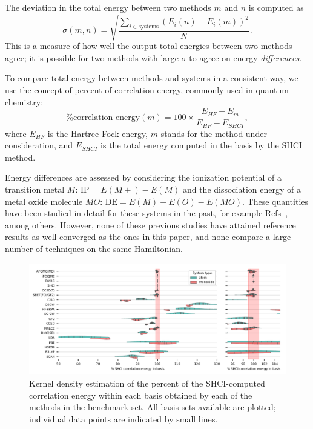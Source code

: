 The deviation in the total energy between two methods $m$ and $n$ is computed as
\begin{equation}
    \sigma(m,n) = \sqrt{\frac{\sum_{i \in \text{systems} } (E_i(n)-E_i(m))^2}{N}}.
    \label{eqn:rms}
\end{equation}
This is a measure of how well the output total energies between two methods agree; it is possible for two methods with large $\sigma$ to agree on energy \textit{differences}. 

To compare total energy between methods and systems in a consistent way, we use the concept of percent of correlation energy, commonly used in quantum chemistry:
\begin{equation}
    \text{\% correlation energy}(m) = 100 \times \frac{E_{HF} - E_{m}}{E_{HF}-E_{SHCI}},
    \label{eqn:correlation_energy}
\end{equation}
where $E_{HF}$ is the Hartree-Fock energy, $m$ stands for the method under consideration, and $E_{SHCI}$ is the total energy computed in the basis by the SHCI method.

Energy differences are assessed by considering the ionization potential of a transition metal $M$: $\text{IP}=E(M+) - E(M)$ and the dissociation energy of a metal oxide molecule $MO$: $\text{DE}=E(M)+E(O)-E(MO)$.
These quantities have been studied in detail for these systems in the past, for example Refs~\cite{bauschlicher_theoretical_1995,furche_performance_2006,doblhoff-dier_diffusion_2016,verma_assessment_2017,xu_practical_2015,bligaard_toward_2016,mardirossian_thirty_2017,minenkov_troubles_2016,thomas_accurate_2015,tew_explicitly_2016,johnson_communication:_2017}, among others. 
However, none of these previous studies have attained reference results as well-converged as the ones in this paper,
and none compare a large number of techniques on the same Hamiltonian.


\begin{figure}
\begin{center}
\includegraphics[width=\linewidth]{figs/correlation_energybar}
\caption{Kernel density estimation of the percent of the SHCI-computed correlation energy within each basis obtained by each of the methods in the benchmark set.
All basis sets available are plotted; individual data points are indicated by small lines.}\label{fig:correlation_energy}
\end{center}
\end{figure}

